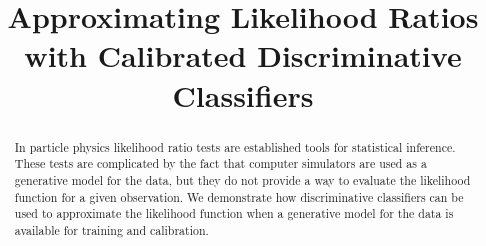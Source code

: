 \documentclass[aoas,preprint]{imsart}
\numberwithin{equation}{section}
\theoremstyle{plain}
\begin{document}
\begin{frontmatter}
\title{Approximating  Likelihood Ratios with Calibrated Discriminative Classifiers}

\begin{aug}
\author{ }



\address{Center for Cosmology and Particle Physics\\
       New York University \\
       New York, NY 10003, USA
\phantom{E-mail:\ }}
\end{aug}


\begin{abstract}%
In particle physics likelihood ratio tests are established tools for statistical inference. 
These tests are complicated by the fact that computer simulators are used as a generative model for 
the data, but they do not provide a way to evaluate the likelihood function for a given
observation. 
We demonstrate how discriminative classifiers can be used to approximate the likelihood function when 
a generative model for the data is available for training and calibration.  
\end{abstract}

\begin{keyword}[class=MSC]
\end{keyword}

\begin{keyword}
\end{keyword}

\end{frontmatter}
\end{document}
